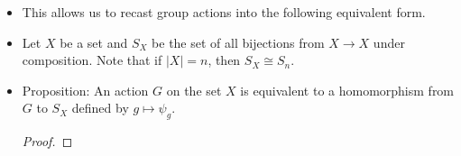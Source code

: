 \documentclass[../notes.tex]{subfiles}
\begin{document}
\begin{itemize}
\begin{proof}
\begin{align*}
            x &= y
        \end{align*}
        Surjectivity: Given $x\in X$, we want $y$ such that $\psi_g(y)=x$. Choose $y=g^{-1}\cdot x$.
    \end{proof}
    \item This allows us to recast group actions into the following equivalent form.
    \item Let $X$ be a set and $S_X$ be the set of all bijections from $X\to X$ under composition. Note that if $|X|=n$, then $S_X\cong S_n$.
    \item Proposition: An action $G$ on the set $X$ is equivalent to a homomorphism from $G$ to $S_X$ defined by $g\mapsto\psi_g$.
    \begin{proof}



\end{proof}
\end{itemize}
\end{document}
